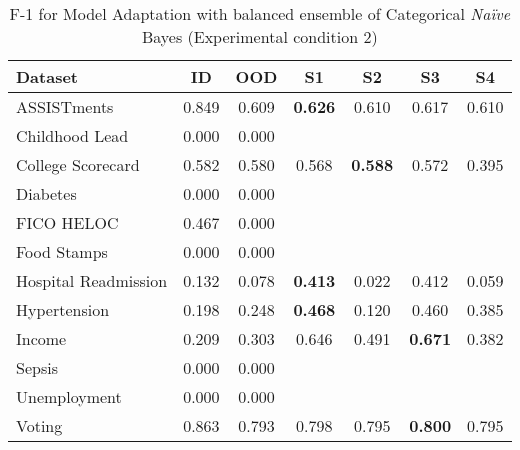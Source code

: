 \begin{table}
\centering
\caption{F-1 for Model Adaptation with balanced ensemble of Categorical \textit{Na\"ive} Bayes (Experimental condition 2)}
\begin{tabular}{lcccccc}
\toprule
{Dataset} & {ID} & {OOD} & {S1} & {S2} & {S3} & {S4} \\
\midrule
ASSISTments & 0.849 & 0.609 & \bfseries 0.626 & 0.610 & 0.617 & 0.610 \\
Childhood Lead & 0.000 & 0.000 &  &  &  &  \\
College Scorecard & 0.582 & 0.580 & 0.568 & \bfseries 0.588 & 0.572 & 0.395 \\
Diabetes & 0.000 & 0.000 &  &  &  &  \\
FICO HELOC & 0.467 & 0.000 &  &  &  &  \\
Food Stamps & 0.000 & 0.000 &  &  &  &  \\
Hospital Readmission & 0.132 & 0.078 & \bfseries 0.413 & 0.022 & 0.412 & 0.059 \\
Hypertension & 0.198 & 0.248 & \bfseries 0.468 & 0.120 & 0.460 & 0.385 \\
Income & 0.209 & 0.303 & 0.646 & 0.491 & \bfseries 0.671 & 0.382 \\
Sepsis & 0.000 & 0.000 &  &  &  &  \\
Unemployment & 0.000 & 0.000 &  &  &  &  \\
Voting & 0.863 & 0.793 & 0.798 & 0.795 & \bfseries 0.800 & 0.795 \\
\bottomrule
\end{tabular}
\end{table}

